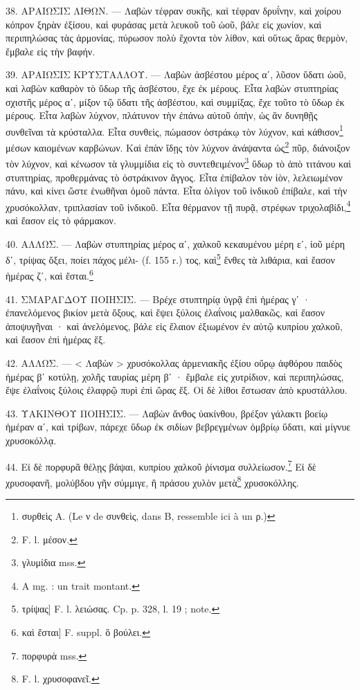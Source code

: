 \documentclass[a4paper, 11pt, oneside, polutonikogreek, french]{article}
\begin{document}
38. ΑΡΑΙΩΣΙΣ ΛΙΘΩΝ. --- Λαβὼν τέφραν συκῆς, καὶ τέφραν δρυΐνην, καὶ χοίρου κόπρον ξηρὰν ἐξίσου, καὶ φυράσας μετὰ λευκοῦ τοῦ ὠοῦ, βάλε εἰς χωνίον, καὶ περιπηλώσας τὰς ἁρμονίας, πύρωσον πολὺ ἔχοντα τὸν λίθον, καὶ οὕτως ἄρας θερμὸν, ἔμβαλε εἰς τὴν βαφήν.

39. ΑΡΑΙΩΣΙΣ ΚΡΥΣΤΑΛΛΟΥ. --- Λαβὼν ἀσβέστου μέρος αʹ, λῦσον ὕδατι ὠοῦ, καὶ λαβὼν καθαρὸν τὸ ὕδωρ τῆς ἀσβέστου, ἔχε ἐκ μέρους. Εἶτα λαβὼν στυπτηρίας σχιστῆς μέρος αʹ, μίξον τῷ ὕδατι τῆς ἀσβέστου, καὶ συμμίξας, ἔχε τοῦτο τὸ ὕδωρ ἐκ μέρους. Εἶτα λαβὼν λύχνον, πλάτυνον τὴν ἐπάνω αὐτοῦ ὀπὴν, ὡς ἂν δυνηθῇς συνθεῖναι τὰ κρύσταλλα. Εἶτα συνθεὶς, πώμασον ὀστράκῳ τὸν λύχνον, καὶ κάθισον\footnote{συρθεὶς A. (Le ν de συνθεὶς, dans B, ressemble ici à un ρ.)} μέσων καιομένων καρβώνων. Καὶ ἐπὰν ἴδῃς τὸν λύχνον ἀνάψαντα ὡς\footnote{F. l. μέσον.} πῦρ, διάνοιξον τὸν λύχνον, καὶ κένωσον τὰ γλυμμίδια εἰς τὸ συντεθειμένον\footnote{γλυμίδια mss.} ὕδωρ τὸ ἀπὸ τιτάνου καὶ στυπτηρίας, προθερμάνας τὸ ὀστράκινον ἄγγος. Εἶτα ἐπίβαλον τὸν ἰὸν, λελειωμένον πάνυ, καὶ κίνει ὥστε ἑνωθῆναι ὁμοῦ πάντα. Εἶτα ὀλίγον τοῦ ἰνδικοῦ ἐπίβαλε, καὶ τὴν χρυσόκολλαν, τριπλασίαν τοῦ ἰνδικοῦ. Εἶτα θέρμανον τῇ πυρᾷ, στρέφων τριχολαβίδι,\footnote{A mg. : un trait montant.} καὶ ἔασον εἰς τὸ φάρμακον.

40. ΑΛΛΩΣ. --- Λαβὼν στυπτηρίας μέρος αʹ, χαλκοῦ κεκαυμένου μέρη εʹ, ἰοῦ μέρη δʹ, τρίψας ὄξει, ποίει πάχος μέλι- (f. 155 r.) τος, καὶ\footnote{τρίψας] F. l. λειώσας. Cp. p. 328, l. 19 ; note.} ἔνθες τὰ λιθάρια, καὶ ἔασον ἡμέρας ζʹ, καὶ ἔσται.\footnote{καὶ ἔσται] F. suppl. ὃ βούλει.}

41. ΣΜΑΡΑΓΔΟΥ ΠΟΙΗΣΙΣ. --- Βρέχε στυπτηρίᾳ ὑγρᾷ ἐπὶ ἡμέρας γʹ · ἐπανελόμενος βικίον μετὰ ὄξους, καὶ ἕψει ξύλοις ἐλαΐνοις μαλθακῶς, καὶ ἔασον ἀποψυγῆναι · καὶ ἀνελόμενος, βάλε εἰς ἔλαιον ἐξιωμένον ἐν αὐτῷ κυπρίου χαλκοῦ, καὶ ἔασον ἐπὶ ἡμέρας ἕξ.

42. ΑΛΛΩΣ. --- < Λαβὼν > χρυσόκολλας ἀρμενιακῆς ἐξίου οὔρῳ ἀφθόρου παιδὸς ἡμέρας βʹ κοτύλῃ, χολῆς ταυρίας μέρη βʹ · ἔμβαλε εἰς χυτρίδιον, καὶ περιπηλώσας, ἕψε ἐλαΐνοις ξύλοις ἐλαφρῷ πυρὶ ἐπὶ ὥρας ἕξ. Οἱ δὲ λίθοι ἔστωσαν ἀπὸ κρυστάλλου.

43. ΥΑΚΙΝΘΟΥ ΠΟΙΗΣΙΣ. --- Λαβὼν ἄνθος ὑακίνθου, βρέξον γάλακτι βοείῳ ἡμέραν αʹ, καὶ τρίβων, πάρεχε ὕδωρ ἐκ σιδίων βεβρεγμένων ὀμβρίῳ ὕδατι, καὶ μίγνυε χρυσοκόλλᾳ.

44. Εἰ δὲ πορφυρᾶ θέλῃς βάψαι, κυπρίου χαλκοῦ ῥίνισμα συλλείωσον.\footnote{πορφυρὰ mss.} Εἰ δὲ χρυσοφανῆ, μολύβδου γῆν σύμμιγε, ἢ πράσου χυλὸν μετὰ\footnote{F. l. χρυσοφανεῖ.} χρυσοκόλλης.
\end{document}
